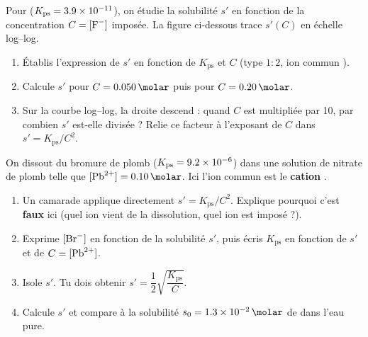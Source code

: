 \documentclass[11pt,a4paper]{article}
\newcommand{\Kps}{K_{\mathrm{ps}}}
\begin{document}
\begin{exercice}
Pour  ($\Kps=\num{3{,}9e-11}$), on étudie la solubilité $s'$ en fonction de la concentration
$C=[\ce{F-}]$ imposée. La figure ci-dessous trace $s'(C)$ en échelle log–log.

\begin{center}
\end{center}

\begin{enumerate}[label=\textbf{\alph*)},leftmargin=2.2em,topsep=2pt,itemsep=2pt]
  \item Établis l'expression de $s'$ en fonction de $\Kps$ et $C$ (type $1{:}2$, ion commun ).
  \item Calcule $s'$ pour $C=\qty{0{,}050}{\molar}$ puis pour $C=\qty{0{,}20}{\molar}$.
  \item Sur la courbe log–log, la droite descend : quand $C$ est multipliée par 10, par combien $s'$
        est-elle divisée ? Relie ce facteur à l'exposant de $C$ dans $s'=\Kps/C^{2}$.
\end{enumerate}
\end{exercice}

\begin{exercice}
On dissout du bromure de plomb  ($\Kps=\num{9{,}2e-6}$) dans une solution de nitrate de plomb
 telle que $[\ce{Pb^2+}]=\qty{0{,}10}{\molar}$. Ici l'ion commun est le \textbf{cation}
.
\begin{enumerate}[label=\textbf{\alph*)},leftmargin=2.2em,topsep=2pt,itemsep=2pt]
  \item Un camarade applique directement $s'=\Kps/C^{2}$. Explique pourquoi c'est \textbf{faux} ici
        (quel ion vient de la dissolution, quel ion est imposé ?).
  \item Exprime $[\ce{Br-}]$ en fonction de la solubilité $s'$, puis écris $\Kps$ en fonction de $s'$ et
        de $C=[\ce{Pb^2+}]$.
  \item Isole $s'$. Tu dois obtenir $s'=\dfrac{1}{2}\sqrt{\dfrac{\Kps}{C}}$.
  \item Calcule $s'$ et compare à la solubilité $s_0=\qty{1{,}3e-2}{\molar}$ de  dans l'eau pure.
\end{enumerate}
\end{exercice}
\end{document}
